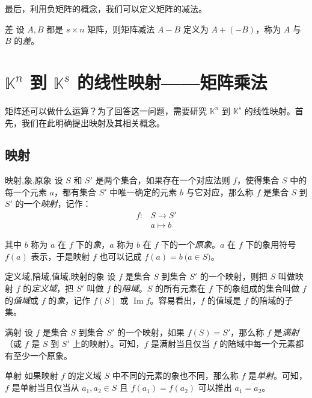 最后，利用负矩阵的概念，我们可以定义矩阵的减法。

\begin{definition}{差}
	设 $A, B$ 都是 $s \times n$ 矩阵，则矩阵减法 $A - B$ 定义为 $A + (-B)$，称为 $A$ 与 $B$ 的\emph{差}。
\end{definition}

\section{$\mathbb K^n$ 到 $\mathbb K^s$ 的线性映射——矩阵乘法}

矩阵还可以做什么运算？为了回答这一问题，需要研究 $\mathbb K^n$ 到 $\mathbb K^s$ 的线性映射。首先，我们在此明确提出映射及其相关概念。

\subsection{映射}

\begin{definition}{映射,象,原象}
	设 $S$ 和 $S'$ 是两个集合，如果存在一个对应法则 $f$，使得集合 $S$ 中的每一个元素 $a$，都有集合 $S'$ 中唯一确定的元素 $b$ 与它对应，那么称 $f$ 是集合 $S$ 到 $S'$ 的一个\emph{映射}，记作：
	$$
	\begin{aligned}
		f \colon & S \to S'
		\\&
		a \mapsto b
	\end{aligned}
	$$

	其中 $b$ 称为 $a$ 在 $f$ 下的\emph{象}，$a$ 称为 $b$ 在 $f$ 下的一个\emph{原象}。$a$ 在 $f$ 下的象用符号 $f(a)$ 表示，于是映射 $f$ 也可以记成 $f(a) = b \pod{a \in S}$。
\end{definition}

\begin{definition}{定义域,陪域,值域,映射的象}
	设 $f$ 是集合 $S$ 到集合 $S'$ 的一个映射，则把 $S$ 叫做映射 $f$ 的\emph{定义域}，把 $S'$ 叫做 $f$ 的\emph{陪域}。$S$ 的所有元素在 $f$ 下的象组成的集合叫做 $f$ 的\emph{值域}或 $f$ 的\emph{象}，记作 $f(S)$ 或 $\operatorname{Im} f$。容易看出，$f$ 的值域是 $f$ 的陪域的子集。
\end{definition}

\begin{definition}{满射}
	设 $f$ 是集合 $S$ 到集合 $S'$ 的一个映射，如果 $f(S) = S'$，那么称 $f$ 是\emph{满射}（或 $f$ 是 $S$ 到 $S'$ 上的映射）。可知，$f$ 是满射当且仅当 $f$ 的陪域中每一个元素都有至少一个原象。
\end{definition}

\begin{definition}{单射}
	如果映射 $f$ 的定义域 $S$ 中不同的元素的象也不同，那么称 $f$ 是\emph{单射}。可知，$f$ 是单射当且仅当从 $a_1, a_2 \in S$ 且 $f(a_1) = f(a_2)$ 可以推出 $a_1 = a_2$。
\end{definition}

